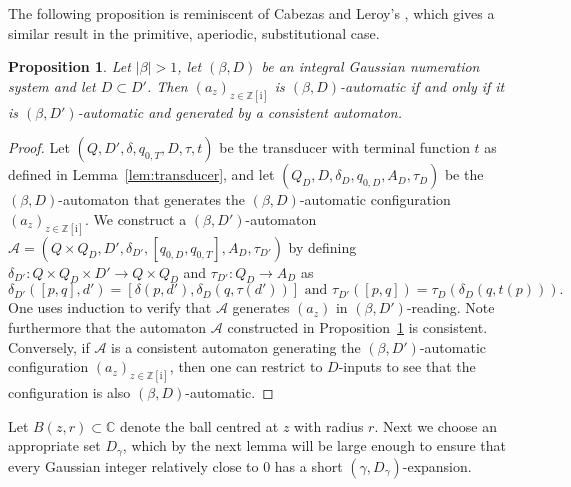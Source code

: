 \documentclass{amsart}
\newcommand{\Z}{\mathbb{Z}}
\newcommand{\C}{\mathbb{C}}
\newcommand{\ii}{\mathrm{i}}
\newtheorem*{main theorem}{Theorem \ref{thm:main-gaussian}}
\newtheorem{proposition}[theorem]{Proposition}
\theoremstyle{definition}
\begin{document}
The following proposition is reminiscent of Cabezas and Leroy's \cite[Proposition 4.1]{Cabezas-Leroy}, which gives a similar result in the primitive, aperiodic, substitutional case.
\begin{proposition}\label{prop:automaticity-equivalent}
Let $|\beta|>1$,
    let $(\beta , D)$ be an integral Gaussian numeration system and let $D\subset D'$. Then $(a_z)_{z\in \Z[\ii]}$ is $(\beta , D)$-automatic if and only if it is 
    $(\beta, D')$-automatic and generated by a consistent automaton. 
\end{proposition}
\begin{proof}
Let $(Q,D',\delta,q_{0,T},D, \tau, t)$ be the transducer with terminal function $t$ as defined in Lemma~\ref{lem:transducer}, and let $(Q_D, D, \delta_D,q_{0,D}, A_D,\tau_D)$ be the $(\beta , D)$-automaton that generates the $(\beta, D)$-automatic configuration $(a_z)_{z\in \Z[\ii]}$. 
We construct a $(\beta, D')$-automaton
$\mathcal A=(Q\times Q_D,D',\delta_{D'}, [q_{0,D},q_{0,T}], A_D, \tau_{D'}   )$ 
by defining  $\delta_{D'}:Q\times Q_D \times D'\rightarrow Q\times Q_D$ and $\tau_{D'} :Q_D\rightarrow A_D$ as
\[ \delta_{D'}([p,q],d') = [\delta(p,d'), \delta_D(q,\tau(d'))] \mbox{ and }   \tau_{D'} ([p,q]) = \tau_D(\delta_D(q,t(p))).\] 
One uses induction to verify that $\mathcal A$ generates $(a_z)$ in  $(\beta, D')$-reading. 
Note furthermore that the automaton  $\mathcal A$ constructed in Proposition~\ref{prop:automaticity-equivalent} is consistent.\\
Conversely, if $\mathcal A$ is a consistent automaton generating the $(\beta, D')$-automatic configuration $(a_z)_{z\in\Z[\ii ]}$, then one can restrict to $D$-inputs to see that the configuration is also $(\beta, D)$-automatic.
\end{proof}




Let $B(z,r)\subset \C$ denote the  ball centred at $z$ with radius $r$. Next we  choose an appropriate set $D_\gamma$, which by the next lemma will be  large enough to ensure that every Gaussian integer relatively close to $0$ has a short $(\gamma, D_\gamma)$-expansion.
\end{document}
